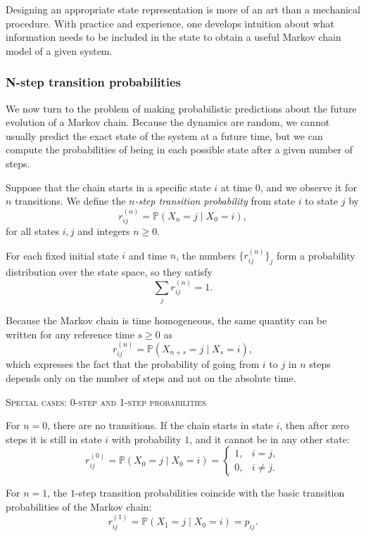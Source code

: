 Designing an appropriate state representation is more of an art than a mechanical procedure.
With practice and experience, one develops intuition about what information needs to be included in the state to obtain a useful Markov chain model of a given system.


\subsubsection{N-step transition probabilities}

We now turn to the problem of making probabilistic predictions about the future evolution of a Markov chain.
Because the dynamics are random, we cannot usually predict the exact state of the system at a future time, but we can compute the probabilities of being in each possible state after a given number of steps.

Suppose that the chain starts in a specific state \(i\) at time \(0\), and we observe it for \(n\) transitions.
We define the \textit{\(n\)-step transition probability} from state \(i\) to state \(j\) by
\[
r_{ij}^{(n)}
=
\mathbb{P}(X_n = j \mid X_0 = i),
\]
for all states \(i,j\) and integers \(n \ge 0\).

For each fixed initial state \(i\) and time \(n\), the numbers \(\{r_{ij}^{(n)}\}_{j}\) form a probability distribution over the state space, so they satisfy
\[
\sum_{j} r_{ij}^{(n)} = 1.
\]

Because the Markov chain is time homogeneous, the same quantity can be written for any reference time \(s \ge 0\) as
\[
r_{ij}^{(n)}
=
\mathbb{P}(X_{n+s} = j \mid X_s = i),
\]
which expresses the fact that the probability of going from \(i\) to \(j\) in \(n\) steps depends only on the number of steps and not on the absolute time.

\bigskip
\textsc{Special cases: 0-step and 1-step probabilities}

For \(n = 0\), there are no transitions.
If the chain starts in state \(i\), then after zero steps it is still in state \(i\) with probability \(1\), and it cannot be in any other state:
\[
r_{ij}^{(0)}
=
\mathbb{P}(X_0 = j \mid X_0 = i)
=
\begin{cases}
1, & i = j, \\
0, & i \ne j.
\end{cases}
\]

For \(n = 1\), the \(1\)-step transition probabilities coincide with the basic transition probabilities of the Markov chain:
\[
r_{ij}^{(1)}
=
\mathbb{P}(X_1 = j \mid X_0 = i)
=
p_{ij}.
\]

